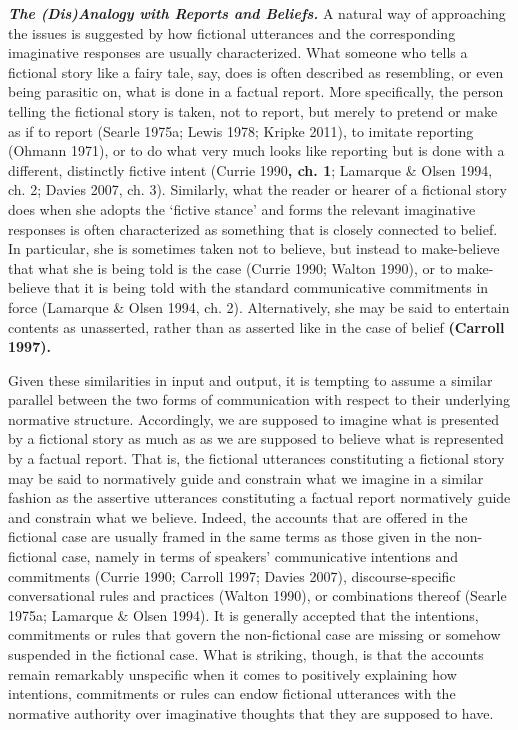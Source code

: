 {\vspace{.2cm}
\noindent\textbf{\emph{The (Dis)Analogy with Reports and Beliefs.}} A natural way of approaching the issues is suggested by how fictional utterances and the corresponding imaginative responses are usually characterized. What someone who tells a fictional story like a fairy tale, say, does is often described as resembling, or even being parasitic on, what is done in a factual report. More specifically, the person telling the fictional story is taken, not to report, but merely to pretend or make as if to report (Searle 1975a; Lewis 1978; Kripke 2011), to imitate reporting (Ohmann 1971), or to do what very much looks like reporting but is done with a different, distinctly fictive intent (Currie 1990\textbf{, ch. 1}; Lamarque \& Olsen 1994, ch. 2; Davies 2007, ch. 3). Similarly, what the reader or hearer of a fictional story does when she adopts the `fictive stance' and forms the relevant imaginative responses is often characterized as something that is closely connected to belief. In particular, she is sometimes taken not to believe, but instead to make-believe that what she is being told is the case (Currie 1990; Walton 1990), or to make-believe that it is being told with the standard communicative commitments in force (Lamarque \& Olsen 1994, ch. 2). Alternatively, she may be said to entertain contents as unasserted, rather than as asserted like in the case of belief \textbf{(Carroll 1997).}

Given these similarities in input and output, it is tempting to assume a similar parallel between the two forms of communication with respect to their underlying normative structure. Accordingly, we are supposed to imagine what is presented by a fictional story as much as as we are supposed to believe what is represented by a factual report. That is, the fictional utterances constituting a fictional story may be said to normatively guide and constrain what we imagine in a similar fashion as the assertive utterances constituting a factual report normatively guide and constrain what we believe. Indeed, the accounts that are offered in the fictional case are usually framed in the same terms as those given in the non-fictional case, namely in terms of speakers' communicative intentions and commitments (Currie 1990; Carroll 1997; Davies 2007), discourse-specific conversational rules and practices (Walton 1990), or combinations thereof (Searle 1975a; Lamarque \& Olsen 1994). It is generally accepted that the intentions, commitments or rules that govern the non-fictional case are missing or somehow suspended in the fictional case. What is striking, though, is that the accounts remain remarkably unspecific when it comes to positively explaining how intentions, commitments or rules can endow fictional utterances with the normative authority over imaginative thoughts that they are supposed to have.

}
